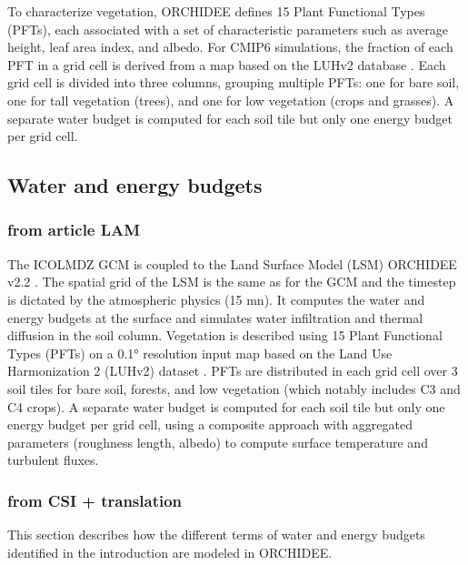 To characterize vegetation, ORCHIDEE defines 15 Plant Functional Types (PFTs), each associated with a set of characteristic parameters such as average height, leaf area index, and albedo. For CMIP6 simulations, the fraction of each PFT in a grid cell is derived from a map based on the LUHv2 database \cite{lurton_implementation_2020}. Each grid cell is divided into three columns, grouping multiple PFTs: one for bare soil, one for tall vegetation (trees), and one for low vegetation (crops and grasses). A separate water budget is computed for each soil tile but only one energy budget per grid cell.

\subsection{Water and energy budgets}
\subsubsection{from article LAM}
The ICOLMDZ GCM is coupled to the Land Surface Model (LSM) ORCHIDEE v2.2 \citep{cheruy_improved_2020}. The spatial grid of the LSM is the same as for the GCM and the timestep is dictated by the atmospheric physics (15 mn).
It computes the water and energy budgets at the surface and simulates water infiltration and thermal diffusion in the soil column. 
Vegetation is described using 15 Plant Functional Types (PFTs) on a 0.1° resolution input map based on the Land Use Harmonization 2 (LUHv2) dataset \citep{hurtt_harmonization_2020, lurton_implementation_2020}. PFTs are distributed in each grid cell over 3 soil tiles for bare soil, forests, and low vegetation (which notably includes C3 and C4 crops).
A separate water budget is computed for each soil tile but only one energy budget per grid cell, using a composite approach with aggregated parameters (roughness length, albedo) to compute surface temperature and turbulent fluxes. 

\subsubsection{from CSI + translation}
This section describes how the different terms of water and energy budgets identified in the introduction are modeled in ORCHIDEE.  

